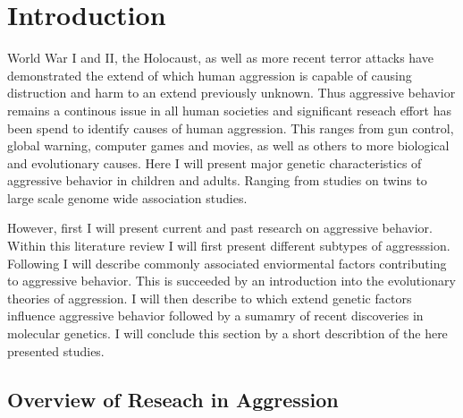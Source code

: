\chapter{Introduction}
\label{cha:introduction}

World War I and II, the Holocaust, as well as more recent terror attacks have demonstrated the extend of which human aggression is capable of causing distruction and harm to an extend previously unknown. 
Thus aggressive behavior remains a continous issue in all human societies and significant reseach effort has been spend to identify causes of human aggression.
This ranges from gun control, global warning, computer games and movies, as well as others to more biological and evolutionary causes. %
Here I will present major genetic characteristics of aggressive behavior in children and adults.
Ranging from studies on twins to large scale genome wide association studies.

However, first I will present current and past research on aggressive behavior.
Within this literature review I will first present different subtypes of aggresssion.
Following I will describe commonly associated enviormental factors contributing to aggressive behavior.
This is succeeded by an introduction into the evolutionary theories of aggression.
I will then describe to which extend genetic factors influence aggressive behavior followed by a sumamry of recent discoveries in molecular genetics.
I will conclude this section by a short describtion of the here presented studies.

\section{Overview of Reseach in Aggression}
\label{sec:overview_of_reseach_in_aggression}

